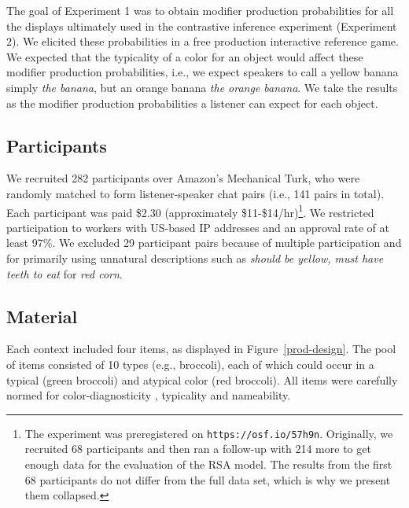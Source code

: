 \documentclass[10pt,letterpaper]{article}
\begin{document}
The goal of Experiment 1 was to obtain modifier production probabilities for all the displays ultimately used in the contrastive inference experiment (Experiment 2). We elicited these probabilities in a free production interactive reference game. We expected that the typicality of a color for an object would affect these modifier production probabilities, i.e., we expect speakers to call a yellow banana simply \textit{the banana}, but an orange banana \textit{the orange banana}. We take the results as the modifier production probabilities a listener can expect for each object.

\subsection{Participants}
We recruited 282 participants over Amazon's Mechanical Turk, who were randomly matched to form listener-speaker chat pairs (i.e., 141 pairs in total). 
Each participant was paid \$2.30 (approximately \$11-\$14/hr)\footnote{The experiment was preregistered on \texttt{https://osf.io/57h9n}. Originally, we recruited 68 participants and then ran a follow-up with 214 more to get enough data for the evaluation of the RSA model. The results from the first 68 participants do not differ from the full data set, which is why we present them collapsed.}. We restricted participation to workers with US-based IP addresses and an approval rate of at least 97\%.
We excluded 29 participant pairs because of multiple participation and for primarily using unnatural descriptions such as \textit{should be yellow, must have teeth to eat} for \textit{red corn}.



\subsection{Material} \label{Material}
Each context included four items, as displayed in Figure~\ref{prod-design}. The pool of items consisted of 10 types (e.g., broccoli), each of which could occur in a typical (green broccoli) and atypical color (red broccoli). All items were carefully normed for color-diagnosticity \cite{Tanaka:1999}, typicality and nameability.
\end{document}
